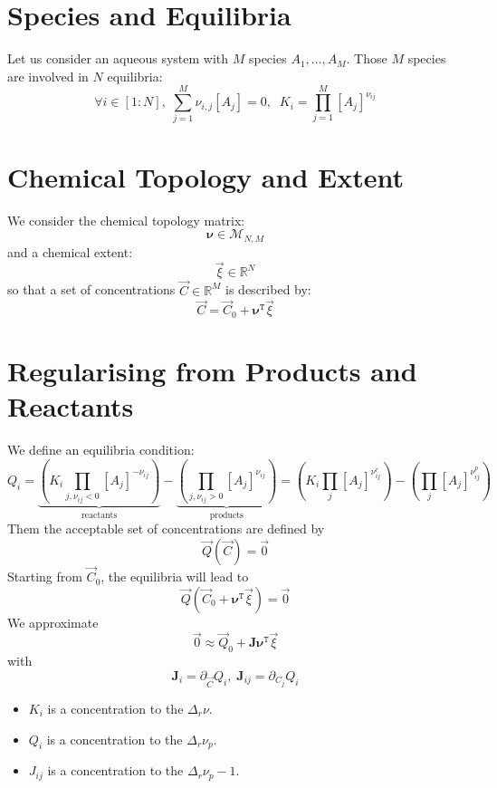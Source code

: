 \documentclass[aps,12pt]{revtex4}
\newcommand{\trn}[1]{{#1}^{\mathtt{T}}}
\newcommand{\conc}[1]{{\left[#1\right]}}
\begin{document}
\section{Species and Equilibria}
Let us consider an aqueous system with $M$ species $A_1,\ldots,A_M$.
Those $M$ species are involved in $N$ equilibria:
\begin{equation}
	\forall i\in[1:N], \; \sum_{j=1}^M \nu_{i,j} \conc{A_j} = 0,
	 \;\; K_i = \prod_{j=1}^M \conc{A_j}^{\nu_{ij}}
\end{equation}

\section{Chemical Topology and Extent}
We consider the chemical topology matrix:
\begin{equation}
	\bm{\nu} \in \mathcal{M}_{N,M}
\end{equation}
and a chemical extent:
\begin{equation}
	\vec{\xi} \in \mathbb{R}^{N}
\end{equation}
so that a set of concentrations $\vec{C}\in\mathbb{R}^M$ is described by:
\begin{equation}
	\vec{C} = \vec{C}_0 + \trn{\bm{\nu}} \vec{\xi}
\end{equation}

\section{Regularising from Products and Reactants}
We define an equilibria condition:
\begin{equation}
	Q_i =  \underbrace{\left(K_i \prod_{j,\nu_{ij}<0} \conc{A_j}^{-\nu_{ij}}\right)}_{\text{reactants}} 
	- \underbrace{\left( \prod_{j,\nu_{ij}>0} \conc{A_j}^{\nu_{ij}}\right)}_{\text{products}}
	= \left(K_i \prod_{j} \conc{A_j}^{\nu^r_{ij}}\right)
	- \left( \prod_{j} \conc{A_j}^{\nu^p_{ij}}\right)  
\end{equation}
Them the acceptable set of concentrations are defined by
\begin{equation}
	\vec{Q}(\vec{C}) = \vec{0}
\end{equation}
Starting from $\vec{C}_0$, the equilibria will lead to
\begin{equation}
	\vec{Q}(\vec{C}_0+\trn{\bm{\nu}} \vec{\xi}) = \vec{0}
\end{equation}
We approximate
\begin{equation}
	\vec{0} \approx \vec{Q}_0 + \bm{J} \trn{\bm{\nu}} \vec{\xi}
\end{equation}
with
\begin{equation}
	\bm{J}_i = \partial_{\vec{C}} Q_i,\; \bm{J}_{ij}= \partial_{C_j} Q_i
\end{equation}

\begin{itemize}
\item $K_i$ is a concentration to the $\Delta_r \nu$.
\item $Q_i$ is a concentration to the $\Delta_r \nu_p$.
\item $J_{ij}$ is a concentration to the $\Delta_r \nu_p-1$.
\end{itemize}
\end{document}
